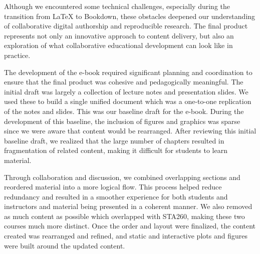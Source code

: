 \documentclass[11pt]{article}
\begin{document}
Although we encountered some technical challenges, especially during the transition from LaTeX to Bookdown, these obstacles deepened our understanding of collaborative digital authorship and reproducible research. The final product represents not only an innovative approach to content delivery, but also an exploration of what collaborative educational development can look like in practice.


The development of the e-book required significant planning and coordination to ensure that the final product was cohesive and pedagogically meaningful. The initial draft was largely a collection of lecture notes and presentation slides. 
We used these to build a single unified document which was a one-to-one replication of the notes and slides.
This was our baseline draft for the e-book.
During the development of this baseline, the inclusion of figures and graphics was sparse since we were aware that content would be rearranged.
After reviewing this initial baseline draft, we realized that the large number of chapters resulted in fragmentation of related content, making it difficult for students to learn material.

Through collaboration and discussion, we combined overlapping sections and reordered material into a more logical flow. This process helped reduce redundancy and resulted in a smoother experience for both students and instructors and material being presented in a coherent manner.
We also removed as much content as possible which overlapped with STA260, making these two courses much more distinct.
Once the order and layout were finalized, the content created was rearranged and refined, and static and interactive plots and figures were built around the updated content.
\end{document}

